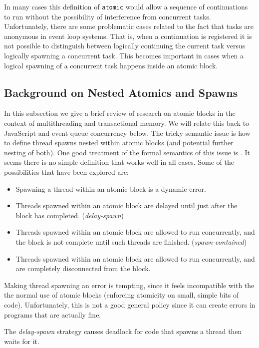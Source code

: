 \documentclass[acmsmall,anonymous,review]{acmart}\settopmatter{printfolios=true,printccs=false,printacmref=false}
\begin{document}
In many cases this definition of \texttt{atomic} would allow a sequence of continuations to run without the possibility of interference from concurrent tasks.
Unfortunately, there are some problematic cases related to the fact that tasks are anonymous in event loop systems.
That is, when a continuation is registered it is not possible to distinguish between logically continuing the current task versus logically spawning a concurrent task.
This becomes important in cases when a logical spawning of a concurrent task happens inside an atomic block.

\subsection{Background on Nested Atomics and Spawns}

In this subsection we give a brief review of research on atomic blocks in the context of multithreading and transactional memory.
We will relate this back to JavaScript and event queue concurrency below.
The tricky semantic issue is how to define thread spawns nested within atomic blocks (and potential further nesting of both).
One good treatment of the formal semantics of this issue is \cite{Moore2008}.
It seems there is no simple definition that works well in all cases.
Some of the possibilities that have been explored are:
\begin{itemize}
\item Spawning a thread within an atomic block is a dynamic error.
\item Threads spawned within an atomic block are delayed until just after the block has completed. (\emph{delay-spawn})
\item Threads spawned within an atomic block are allowed to run concurrently, and the block is not complete until such threads are finished. (\emph{spawn-contained})
\item Threads spawned within an atomic block are allowed to run concurrently, and are completely disconnected from the block.
\end{itemize}

Making thread spawning an error is tempting, since it feels incompatible with the the normal use of atomic blocks (enforcing atomicity on small, simple bits of code).
Unfortunately, this is not a good general policy since it can create errors in programs that are actually fine.

The \emph{delay-spawn} strategy causes deadlock for code that spawns a thread then waits for it.
\end{document}
